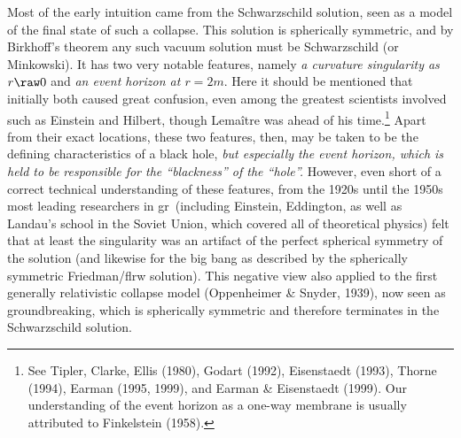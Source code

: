 \documentclass[12pt]{article}
\newcommand{\GR}{{\sc gr}}
\begin{document}
 Most of the early intuition came from the Schwarzschild solution, seen as a  model of the final state of such a collapse. This solution is spherically symmetric, and by Birkhoff's theorem any such vacuum solution must be Schwarzschild (or Minkowski). It has
 two very notable features, namely \emph{a curvature singularity as $r\raw 0$} and \emph{an event horizon at $r=2m$}.
Here it should be mentioned that  initially both  caused great confusion, even among the greatest scientists involved such as Einstein and Hilbert, though  Lema\^{i}tre was ahead of his time.\footnote{See Tipler, Clarke, Ellis (1980),  Godart (1992),
 Eisenstaedt (1993), Thorne (1994), Earman (1995, 1999),  and Earman \& Eisenstaedt (1999). Our understanding of the event horizon as a one-way membrane is usually attributed to Finkelstein (1958).}  Apart from their exact locations, these two features, then, may be taken to be the defining characteristics of a black hole, \emph{but especially the event horizon, which is held to be responsible for the ``blackness'' of the ``hole''.} 
 However, even short of a correct technical understanding of these features,
 from the 1920s until the 1950s most leading researchers in \GR\ (including Einstein, Eddington, as well as Landau's school in the Soviet Union, which covered all of theoretical physics) felt that at least the singularity was an artifact of the perfect spherical symmetry of the solution (and likewise for the big bang as described by the spherically symmetric Friedman/{\sc flrw} solution). This negative view also applied to the 
first  generally relativistic collapse model (Oppenheimer \& Snyder, 1939), now seen as groundbreaking, which is spherically  symmetric and therefore terminates in the Schwarzschild solution.
\end{document}
